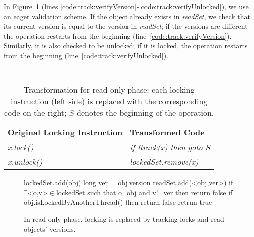 In Figure~\ref{figure::track} (lines \ref{code:track:verifyVersion}-\ref{code:track:verifyUnlocked}), we use an eager validation scheme.
If the object already exists in \emph{readSet}, we check that its current version is equal
to the version in \emph{readSet}; if the versions are different  the operation restarts from the beginning (line~\ref{code:track:verifyVersion}).
Similarly, it is also checked to be unlocked; if it is locked, the operation restarts from the beginning (line~\ref{code:track:verifyUnlocked}).



\begin{table}
\scriptsize
\ttfamily
{\tt
\begin{center}
\begin{tabular}{|l|l|}
\hline
\textbf{Original Locking Instruction} & \textbf{Transformed Code}\\
\hline
\textit{x.lock()}&
\textit{if !track(x) then goto $S$}
\\
\hline
\textit{x.unlock()}&
\textit{lockedSet.remove(x)}
\\
\hline
\end{tabular}
\end{center}
}
\caption{Transformation for read-only phase:
each locking instruction (left side) is replaced with the corresponding code on the right;
 $S$  denotes the beginning of the operation.
}
\label{Ta:readOnlyTransformation}
\end{table}

\begin{figure}
\scriptsize
\begin{algorithmic}[1]{}
		{\ttfamily
		\State{}lockedSet.add(obj) \label{code:lockedSet:add}
			\State long ver = obj.version \label{code:track:getVersion}
			\State readSet.add(<obj,ver>)
			\State if {$\exists$<o,v>$\in$lockedSet such that o=obj and v!=ver} then return false \label{code:track:verifyVersion}
			\State if {obj.isLockedByAnotherThread()} then return false \label{code:track:verifyUnlocked}
			\State retrun true
		\EndFunction
		}
\end{algorithmic}
\caption{In read-only phase, locking is replaced by
tracking locks and read
objects' versions.
\label{figure::track}}
\end{figure}


